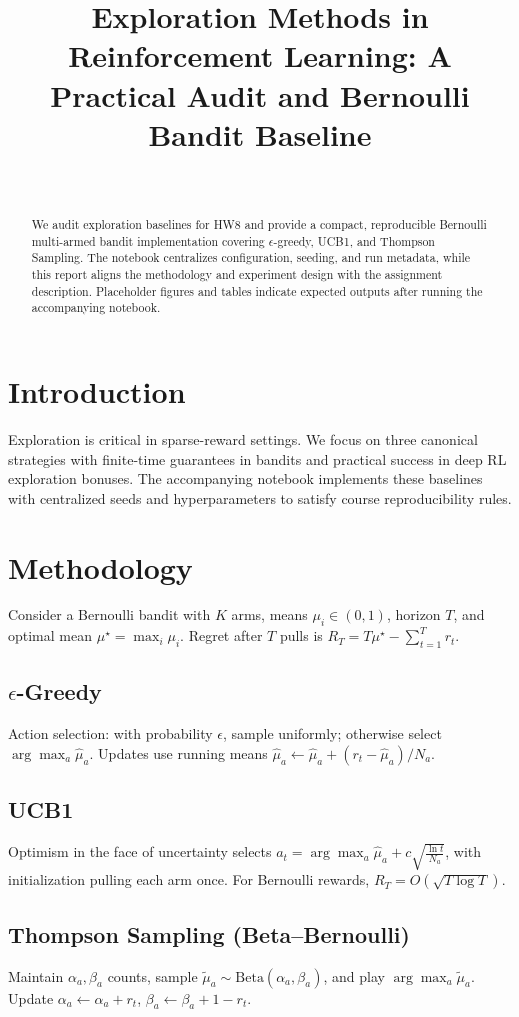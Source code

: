 \documentclass[conference]{IEEEtran}
\title{Exploration Methods in Reinforcement Learning: A Practical Audit and Bernoulli Bandit Baseline}
\author{\IEEEauthorblockN{Anonymous}\\
\IEEEauthorblockA{Deep Reinforcement Learning Course (HW8)}}
\begin{document}
\maketitle

\begin{abstract}
We audit exploration baselines for HW8 and provide a compact, reproducible Bernoulli multi-armed bandit implementation covering $\epsilon$-greedy, UCB1, and Thompson Sampling. The notebook centralizes configuration, seeding, and run metadata, while this report aligns the methodology and experiment design with the assignment description. Placeholder figures and tables indicate expected outputs after running the accompanying notebook.
\end{abstract}

\section{Introduction}
Exploration is critical in sparse-reward settings. We focus on three canonical strategies with finite-time guarantees in bandits and practical success in deep RL exploration bonuses. The accompanying notebook implements these baselines with centralized seeds and hyperparameters to satisfy course reproducibility rules.

\section{Methodology}
Consider a Bernoulli bandit with $K$ arms, means $\mu_i \in (0,1)$, horizon $T$, and optimal mean $\mu^\star = \max_i \mu_i$. Regret after $T$ pulls is $R_T = T \mu^\star - \sum_{t=1}^T r_t$.
\subsection{$\epsilon$-Greedy}
Action selection: with probability $\epsilon$, sample uniformly; otherwise select $\arg\max_a \hat{\mu}_a$. Updates use running means $\hat{\mu}_a \leftarrow \hat{\mu}_a + (r_t - \hat{\mu}_a)/N_a$.
\subsection{UCB1}
Optimism in the face of uncertainty selects
$a_t = \arg\max_a \hat{\mu}_a + c \sqrt{\frac{\ln t}{N_a}}$,
with initialization pulling each arm once. For Bernoulli rewards, $R_T = O(\sqrt{T \log T})$.
\subsection{Thompson Sampling (Beta--Bernoulli)}
Maintain $\alpha_a, \beta_a$ counts, sample $\tilde{\mu}_a \sim \mathrm{Beta}(\alpha_a, \beta_a)$, and play $\arg\max_a \tilde{\mu}_a$. Update $\alpha_a \leftarrow \alpha_a + r_t$, $\beta_a \leftarrow \beta_a + 1 - r_t$.
\end{document}

